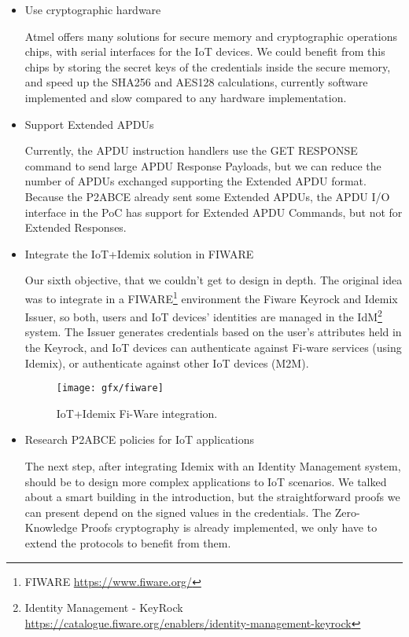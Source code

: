 \begin{itemize}
	
	\item Use cryptographic hardware
	
	Atmel offers many solutions for secure memory and cryptographic operations chips, with serial interfaces for the IoT devices. We could benefit from this chips by storing the secret keys of the credentials inside the secure memory, and speed up the SHA256 and AES128 calculations, currently software implemented and slow compared to any hardware implementation. 
	
	
	
	\item Support Extended APDUs
	
	Currently, the APDU instruction handlers use the GET RESPONSE command to send large APDU Response Payloads, but we can reduce the number of APDUs exchanged supporting the Extended APDU format. Because the P2ABCE already sent some Extended APDUs, the APDU I/O interface in the PoC has support for Extended APDU Commands, but not for Extended Responses.
	
	\item Integrate the IoT+Idemix solution in FIWARE
	
	Our sixth objective, that we couldn't get to design in depth. The original idea was to integrate in a FIWARE\footnote{FIWARE \url{https://www.fiware.org/}} environment the Fiware Keyrock and Idemix Issuer, so both, users and IoT devices' identities are managed in the IdM\footnote{Identity Management - KeyRock \url{https://catalogue.fiware.org/enablers/identity-management-keyrock}} system. The Issuer generates credentials based on the user’s attributes held in the Keyrock, and IoT devices can authenticate against Fi-ware services (using Idemix), or authenticate against other IoT devices (M2M).
	
	\begin{figure}[bth]
		\begin{center}
			\texttt{[image: gfx/fiware]}
		\end{center}
		\caption{IoT+Idemix Fi-Ware integration.}
		\label{fig:fiware}
	\end{figure}

	\item Research P2ABCE policies for IoT applications
	
	The next step, after integrating Idemix with an Identity Management system, should be to design more complex applications to IoT scenarios. We talked about a smart building in the introduction, but the straightforward proofs we can present depend on the signed values in the credentials. The Zero-Knowledge Proofs cryptography is already implemented, we only have to extend the protocols to benefit from them.
	

\end{itemize}
